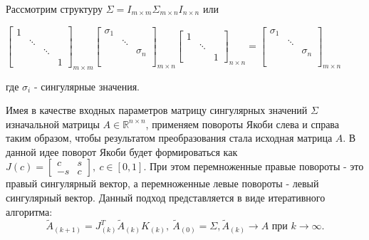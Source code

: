 
Рассмотрим структуру $\Sigma = I_{m\times m}\Sigma_{m\times n}I_{n\times n}$ или

\begin{center}
    $\begin{bmatrix}
        1 & & & \\
         & \ddots & & \\
         & & \ddots & \\
         & & & 1
    \end{bmatrix}_{m \times m}
    \begin{bmatrix}
        \sigma_1 & & \\
         & \ddots & \\
         & & \sigma_n \\
         & & \\
         & & 
    \end{bmatrix}_{m \times n}
    \begin{bmatrix}
        1 & & \\
         & \ddots & \\
         & & 1
    \end{bmatrix}_{n \times n}
    =
    \begin{bmatrix}
        \sigma_1 & & \\
         & \ddots & \\
         & & \sigma_n \\
         & & \\
         & & 
    \end{bmatrix}_{m \times n}$
    
    \vspace{1em} 
    где $\sigma_i$ - сингулярные значения.
\end{center}

Имея в качестве входных параметров матрицу сингулярных значений $\Sigma$ изначальной матрицы $A\in \mathbb{R}^{n\times n}$, применяем повороты Якоби слева и справа таким образом, чтобы результатом преобразования стала исходная матрица $A$. В данной идее поворот Якоби будет формироваться как $J(c) = \begin{bmatrix}
    c&s\\-s&c
\end{bmatrix},\ c\in[0,1]$. При этом перемноженные правые повороты - это правый сингулярный вектор, а перемноженные левые повороты - левый сингулярный вектор. Данный подход представляется в виде итеративного алгоритма:
\begin{equation}
    \tilde{A}_{(k+1)}=J^T_{(k)}\tilde{A}_{(k)}K_{(k)},\ \tilde{A}_{(0)} = \Sigma, \tilde{A}_{(k)} \longrightarrow A\text{ при }k \to \infty.
\end{equation}

